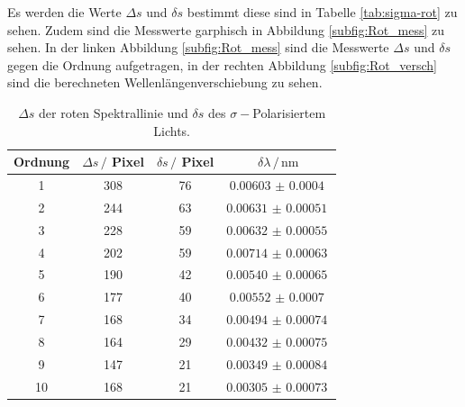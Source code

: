 Es werden die Werte $\Delta s$ und $\delta s$ bestimmt diese sind in Tabelle \autoref{tab:sigma-rot} zu sehen.
Zudem sind die Messwerte garphisch in Abbildung \autoref{subfig:Rot_mess} zu sehen.
In der linken Abbildung \autoref{subfig:Rot_mess} sind die Messwerte $\Delta s$ und $\delta s$ gegen die Ordnung aufgetragen,
in der rechten Abbildung \autoref{subfig:Rot_versch} sind die berechneten Wellenlängenverschiebung zu sehen.
\begin{table}
    \centering
    \caption{$\Delta s$ der roten Spektrallinie und $\delta s$ des $\sigma -$Polarisiertem Lichts.}
    \begin{tabular}{cccc}
        \toprule
        Ordnung & $\Delta s \, /$ Pixel & $\delta s \, /$ Pixel & $\delta \lambda \, / \, \si{\nano\meter}$ \\
        \midrule
        1   &   308  &    76 & $\SI{0.00603(40)}{}$   \\
        2   &   244  &    63 & $\SI{0.00631(51)}{}$   \\
        3   &   228  &    59 & $\SI{0.00632(55)}{}$   \\
        4   &   202  &    59 & $\SI{0.00714(63)}{}$   \\
        5   &   190  &    42 & $\SI{0.00540(65)}{}$   \\
        6   &   177  &    40 & $\SI{0.00552(70)}{}$   \\
        7   &   168  &    34 & $\SI{0.00494(74)}{}$   \\
        8   &   164  &    29 & $\SI{0.00432(75)}{}$   \\
        9   &   147  &    21 & $\SI{0.00349(84)}{}$   \\
        10  &   168  &    21 & $\SI{0.00305(73)}{}$   \\
        \bottomrule
    \end{tabular}
    \label{tab:sigma-rot}
\end{table}

